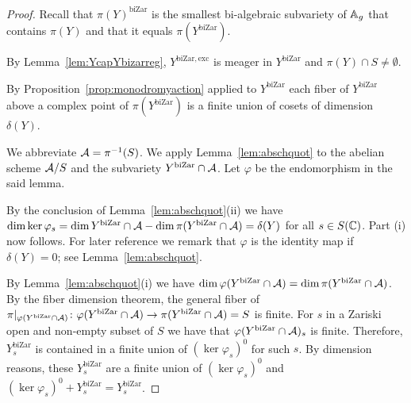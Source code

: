 \documentclass[12pt,oneside]{amsart}
\begin{document}
\begin{proof}
  Recall that $\pi(Y)^{\mathrm{biZar}}$ is
  the smallest bi-algebraic subvariety of ${\mathbb{A}}_{g}$ that contains
  $\pi(Y)$ and
  that  it equals $\pi(Y^{\mathrm{biZar}})$.

  By Lemma~\ref{lem:YcapYbizarreg}, $Y^{\mathrm{biZar,exc}}$ is meager
  in $Y^{\mathrm{biZar}}$ and $\pi(Y)\cap S\not=\emptyset$.


  
  
  By Proposition~\ref{prop:monodromyaction} applied to
  $Y^{\mathrm{biZar}}$ 
  each fiber of $Y^{\mathrm{biZar}}$ above a complex point of
  $\pi(Y^{\mathrm{biZar}})$ is a finite union of cosets of dimension
  $\delta(Y)$.
  
  We abbreviate $\mathcal{A} = \pi^{-1}(S)$. 
  We apply Lemma~\ref{lem:abschquot} to the abelian scheme $\mathcal{A}/S$ and
  the subvariety $Y^{\mathrm{biZar}}\cap \mathcal{A}$. Let $\varphi$ be the
  endomorphism in the said lemma.


  By the conclusion of Lemma~\ref{lem:abschquot}(ii) we have
  $\dim\ker\varphi_{s} = \dim Y^{\mathrm{biZar}}\cap \mathcal{A} - \dim
  \pi(Y^{\mathrm{biZar}}\cap \mathcal{A})=\delta(Y)$ for all $s\in S({\mathbb{C}})$.
  Part  (i) now  follows. For later reference we remark that $\varphi$
  is the identity map if 
  $\delta(Y)=0$; see Lemma~\ref{lem:abschquot}. 


  By Lemma~\ref{lem:abschquot}(i) we have $\dim
  \varphi(Y^{\mathrm{biZar}}\cap \mathcal{A}) = \dim \pi(Y^{\mathrm{biZar}}\cap
  \mathcal{A})$. %
  By the fiber dimension theorem, the general fiber of
  $\pi|_{\varphi(Y^{\mathrm{biZar}}\cap\mathcal{A})} \colon
  \varphi(Y^{\mathrm{biZar}}\cap\mathcal{A}) \rightarrow
  \pi(Y^{\mathrm{biZar}}\cap\mathcal{A})=S$ is finite. For $s$ in a Zariski open
  and non-empty subset of $S$ we have that $\varphi(Y^{\mathrm{biZar}}\cap\mathcal{A})_s$ is
  finite. Therefore, $Y^{\mathrm{biZar}}_s$ is contained in a finite
  union of $(\ker\varphi_s)^0$ for such $s$. By dimension reasons, these
  $Y^{\mathrm{biZar}}_s$ are a finite union of $(\ker\varphi_s)^0$ and
  $(\ker\varphi_s)^0+Y^{\mathrm{biZar}}_s=Y^{\mathrm{biZar}}_s$.


\end{proof}
\end{document}

